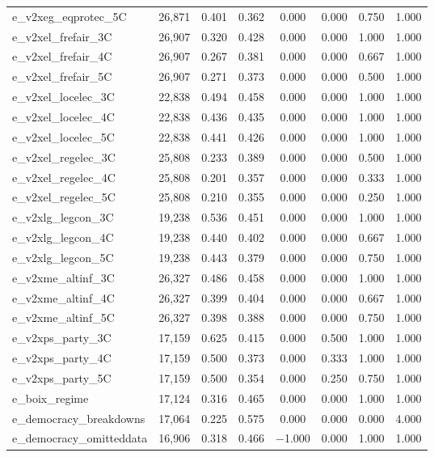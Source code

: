 \begin{table}[!htbp]
\begin{tabular}{@{\extracolsep{5pt}}lccccccc}
e\_v2xeg\_eqprotec\_5C & 26,871 & 0.401 & 0.362 & 0.000 & 0.000 & 0.750 & 1.000 \\ 
e\_v2xel\_frefair\_3C & 26,907 & 0.320 & 0.428 & 0.000 & 0.000 & 1.000 & 1.000 \\ 
e\_v2xel\_frefair\_4C & 26,907 & 0.267 & 0.381 & 0.000 & 0.000 & 0.667 & 1.000 \\ 
e\_v2xel\_frefair\_5C & 26,907 & 0.271 & 0.373 & 0.000 & 0.000 & 0.500 & 1.000 \\ 
e\_v2xel\_locelec\_3C & 22,838 & 0.494 & 0.458 & 0.000 & 0.000 & 1.000 & 1.000 \\ 
e\_v2xel\_locelec\_4C & 22,838 & 0.436 & 0.435 & 0.000 & 0.000 & 1.000 & 1.000 \\ 
e\_v2xel\_locelec\_5C & 22,838 & 0.441 & 0.426 & 0.000 & 0.000 & 1.000 & 1.000 \\ 
e\_v2xel\_regelec\_3C & 25,808 & 0.233 & 0.389 & 0.000 & 0.000 & 0.500 & 1.000 \\ 
e\_v2xel\_regelec\_4C & 25,808 & 0.201 & 0.357 & 0.000 & 0.000 & 0.333 & 1.000 \\ 
e\_v2xel\_regelec\_5C & 25,808 & 0.210 & 0.355 & 0.000 & 0.000 & 0.250 & 1.000 \\ 
e\_v2xlg\_legcon\_3C & 19,238 & 0.536 & 0.451 & 0.000 & 0.000 & 1.000 & 1.000 \\ 
e\_v2xlg\_legcon\_4C & 19,238 & 0.440 & 0.402 & 0.000 & 0.000 & 0.667 & 1.000 \\ 
e\_v2xlg\_legcon\_5C & 19,238 & 0.443 & 0.379 & 0.000 & 0.000 & 0.750 & 1.000 \\ 
e\_v2xme\_altinf\_3C & 26,327 & 0.486 & 0.458 & 0.000 & 0.000 & 1.000 & 1.000 \\ 
e\_v2xme\_altinf\_4C & 26,327 & 0.399 & 0.404 & 0.000 & 0.000 & 0.667 & 1.000 \\ 
e\_v2xme\_altinf\_5C & 26,327 & 0.398 & 0.388 & 0.000 & 0.000 & 0.750 & 1.000 \\ 
e\_v2xps\_party\_3C & 17,159 & 0.625 & 0.415 & 0.000 & 0.500 & 1.000 & 1.000 \\ 
e\_v2xps\_party\_4C & 17,159 & 0.500 & 0.373 & 0.000 & 0.333 & 1.000 & 1.000 \\ 
e\_v2xps\_party\_5C & 17,159 & 0.500 & 0.354 & 0.000 & 0.250 & 0.750 & 1.000 \\ 
e\_boix\_regime & 17,124 & 0.316 & 0.465 & 0.000 & 0.000 & 1.000 & 1.000 \\ 
e\_democracy\_breakdowns & 17,064 & 0.225 & 0.575 & 0.000 & 0.000 & 0.000 & 4.000 \\ 
e\_democracy\_omitteddata & 16,906 & 0.318 & 0.466 & $-$1.000 & 0.000 & 1.000 & 1.000 \\ 

\end{tabular}
\end{table}
